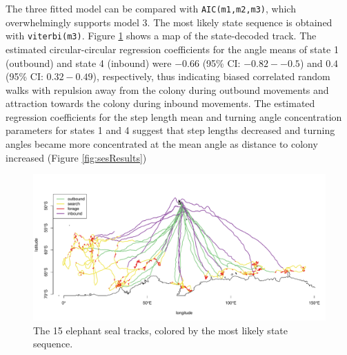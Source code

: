 \documentclass[12pt]{article}\usepackage[]{graphicx}\usepackage[]{color}
\begin{document}
The three fitted model can be compared with \verb|AIC(m1,m2,m3)|, which overwhelmingly supports model 3. The most likely state sequence is obtained with \verb|viterbi(m3)|. Figure \ref{fig:sesTracks} shows a map of the state-decoded track. The estimated circular-circular regression coefficients for the angle means of state 1 (outbound) and state 4 (inbound) were $-0.66$ (95\% CI: $-0.82--0.5$) and $0.4$ (95\% CI: $0.32-0.49$), respectively, thus indicating biased correlated random walks with repulsion away from the colony during outbound movements and attraction towards the colony during inbound movements. The estimated regression coefficients for the step length mean and turning angle concentration parameters for states 1 and 4 suggest that step lengths decreased and turning angles became more concentrated at the mean angle as distance to colony increased (Figure \ref{fig:sesResults})

\begin{figure}[htbp]
  \centering
  \includegraphics[width=\textwidth]{plot_sesResults2}
  \caption{The 15 elephant seal tracks, colored by the most likely state sequence.}
  \label{fig:sesTracks}
\end{figure}
\end{document}
